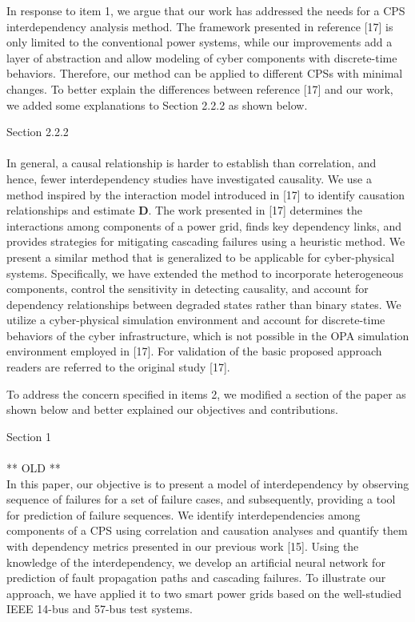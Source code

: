 \documentclass{article}
\newenvironment{response}{
  \doublespacing
  \setlength\parindent{0.05\linewidth}
  \ttfamily
}{}
\newenvironment{textblock}[1]
{\begin{tcolorbox}[breakable,enhanced]{#1 \\ \\}}
{\end{tcolorbox}}
\begin{document}
\begin{response}
In response to item 1, we argue that our work has addressed the needs for a CPS interdependency analysis method. The framework presented in reference [17] is only limited to the conventional power systems, while our improvements add a layer of abstraction and allow modeling of cyber components with discrete-time behaviors. Therefore, our method can be applied to different CPSs with minimal changes. To better explain the differences between reference [17] and our work, we added some explanations to Section 2.2.2 as shown below.

\begin{textblock}{Section 2.2.2}
In general, a causal relationship is harder to establish than correlation, and hence, fewer interdependency studies have investigated causality. We use a method inspired by the interaction model introduced in [17] to identify causation relationships and estimate $\mathbf{D}$. The work presented in [17] determines the interactions among components of a power grid, finds key dependency links, and provides strategies for mitigating cascading failures using a heuristic method. We present a similar method that is generalized to be applicable for cyber-physical systems. Specifically, we have extended the method to incorporate heterogeneous components, control the sensitivity in detecting causality, and account for dependency relationships between degraded states rather than binary states. We utilize a cyber-physical simulation environment and account for discrete-time behaviors of the cyber infrastructure, which is not possible in the OPA simulation environment employed in [17]. For validation of the basic proposed approach readers are referred to the original study [17].
\end{textblock}

To address the concern specified in items 2, we modified a section of the paper as shown below and better explained our objectives and contributions.

\begin{textblock}{Section 1}
** OLD **\\
In this paper, our objective is to present a model of interdependency by observing sequence of failures for a set of failure cases, and subsequently, providing a tool for prediction of failure sequences. We identify interdependencies among components of a CPS using correlation and causation analyses and quantify them with dependency metrics presented in our previous work [15]. Using the knowledge of the interdependency, we develop an artificial neural network for prediction of fault propagation paths and cascading failures. To illustrate our approach, we have applied it to two smart power grids based on the well-studied IEEE 14-bus and 57-bus test systems.


\end{textblock}
\end{response}
\end{document}
